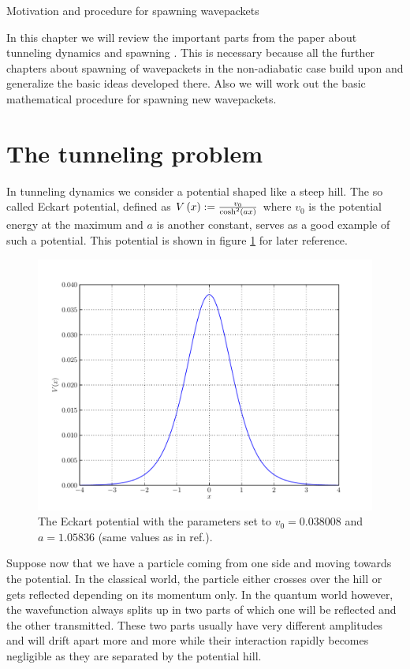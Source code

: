 \begin{chapter}{Motivation and procedure for spawning wavepackets}
\label{ch:spawnprocedure}

In this chapter we will review the important parts from the paper about tunneling
dynamics and spawning \cite{GHJ_tunneling_spawning}. This is necessary because all
the further chapters about spawning of wavepackets in the non-adiabatic case build
upon and generalize the basic ideas developed there. Also we will work out the basic
mathematical procedure for spawning new wavepackets.


\section{The tunneling problem}

In tunneling dynamics we consider a potential shaped like a steep hill. The so
called Eckart potential, defined as $V\left( x \right) := \frac{v_0}{\cosh^2 \left( a x \right)}$
where $v_0$ is the potential energy at the maximum and $a$ is another constant,
serves as a good example of such a potential. This potential is shown in figure
\ref{fig:eckart_potential} for later reference.

\begin{figure}
  \centering
  \includegraphics[scale=0.4]{./figures/eckart.pdf}
  \caption[The Eckart potential]{The Eckart potential with the parameters set to $v_0 = 0.038008$ and
  $a = 1.05836$ (same values as in ref.\cite{GHJ_tunneling_spawning}).}
  \label{fig:eckart_potential}
\end{figure}

Suppose now that we have a particle coming from one side and moving towards the
potential. In the classical world, the particle either crosses over the hill or
gets reflected depending on its momentum only. In the quantum world however, the
wavefunction always splits up in two parts of which one will be reflected and the
other transmitted. These two parts usually have very different amplitudes and will
drift apart more and more while their interaction rapidly becomes negligible as
they are separated by the potential hill.


\end{chapter}
